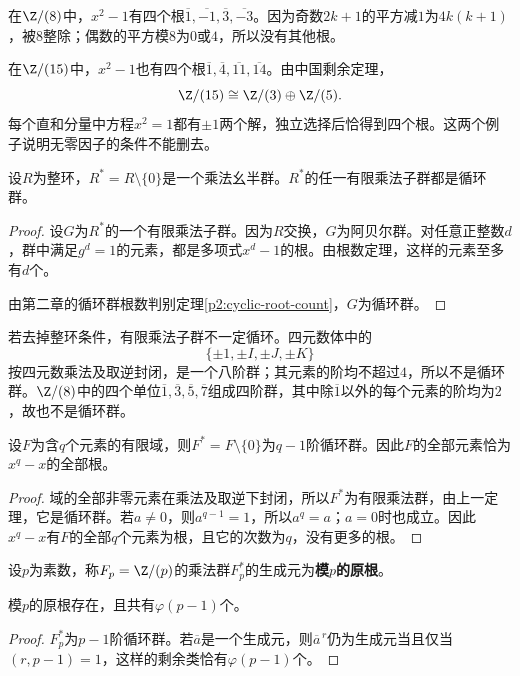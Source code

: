 \begin{example}
在$\Z/(8)$中，$x^2-1$有四个根$\overline1,\overline{-1},\overline3,\overline{-3}$。因为奇数$2k+1$的平方减$1$为$4k(k+1)$，被$8$整除；偶数的平方模$8$为$0$或$4$，所以没有其他根。

在$\Z/(15)$中，$x^2-1$也有四个根$\overline1,\overline4,\overline{11},\overline{14}$。由中国剩余定理，
\[
\Z/(15)\cong\Z/(3)\oplus\Z/(5).
\]
每个直和分量中方程$x^2=1$都有$\pm1$两个解，独立选择后恰得到四个根。这两个例子说明无零因子的条件不能删去。
\end{example}

\begin{theorem}\label{p2:finite-multiplicative-subgroup}
设$R$为整环，$R^*=R\setminus\{0\}$是一个乘法幺半群。$R^*$的任一有限乘法子群都是循环群。
\end{theorem}
\begin{proof}
设$G$为$R^*$的一个有限乘法子群。因为$R$交换，$G$为阿贝尔群。对任意正整数$d$，群中满足$g^d=1$的元素，都是多项式$x^d-1$的根。由根数定理，这样的元素至多有$d$个。

由第二章的循环群根数判别定理\ref{p2:cyclic-root-count}，$G$为循环群。
\end{proof}

\begin{example}
若去掉整环条件，有限乘法子群不一定循环。四元数体中的
\[
\{\pm1,\pm I,\pm J,\pm K\}
\]
按四元数乘法及取逆封闭，是一个八阶群；其元素的阶均不超过$4$，所以不是循环群。$\Z/(8)$中的四个单位$\overline1,\overline3,\overline5,\overline7$组成四阶群，其中除$\overline1$以外的每个元素的阶均为$2$，故也不是循环群。
\end{example}

\begin{corollary}
设$F$为含$q$个元素的有限域，则$F^*=F\setminus\{0\}$为$q-1$阶循环群。因此$F$的全部元素恰为$x^q-x$的全部根。
\end{corollary}
\begin{proof}
域的全部非零元素在乘法及取逆下封闭，所以$F^*$为有限乘法群，由上一定理，它是循环群。若$a\ne0$，则$a^{q-1}=1$，所以$a^q=a$；$a=0$时也成立。因此$x^q-x$有$F$的全部$q$个元素为根，且它的次数为$q$，没有更多的根。
\end{proof}

\begin{definition}\label{p2:concept:c3-primitive-root}
设$p$为素数，称$F_p=\Z/(p)$的乘法群$F_p^*$的生成元为\textbf{模$p$的原根}。
\end{definition}

\begin{corollary}
模$p$的原根存在，且共有$\varphi(p-1)$个。
\end{corollary}
\begin{proof}
$F_p^*$为$p-1$阶循环群。若$\overline a$是一个生成元，则$\overline a^{\,r}$仍为生成元当且仅当$(r,p-1)=1$，这样的剩余类恰有$\varphi(p-1)$个。
\end{proof}

